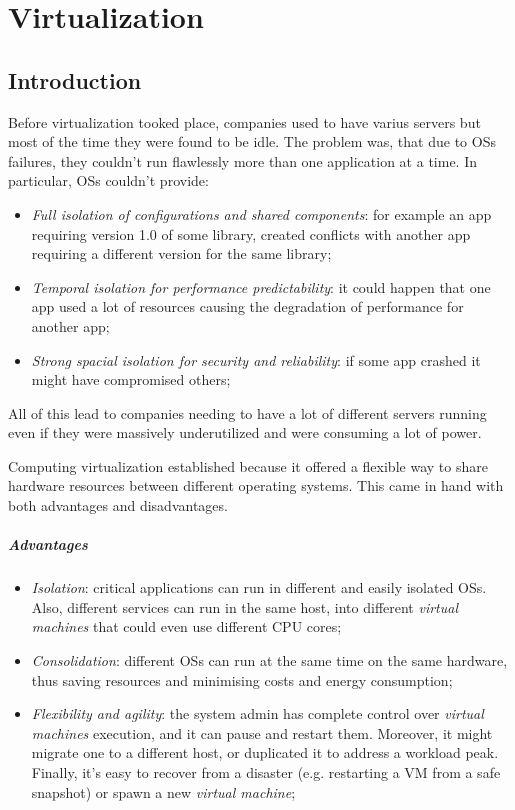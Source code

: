 \chapter{Virtualization}
\section{Introduction}
Before virtualization tooked place, companies used to have varius servers but
most of the time they were found to be idle. The problem was, that due to OSs
failures, they couldn't run flawlessly more than one application at a time. In
particular, OSs couldn't provide:
\begin{itemize}
    \item\emph{Full isolation of configurations and shared components}: for
    example an app requiring version 1.0 of some library, created conflicts
    with another app requiring a different version for the same library;
    \item\emph{Temporal isolation for performance predictability}: it could
    happen that one app used a lot of resources causing the degradation of
    performance for another app;
    \item\emph{Strong spacial isolation for security and reliability}: if
    some app crashed it might have compromised others;
\end{itemize}
All of this lead to companies needing to have a lot of different servers running
even if they were massively underutilized and were consuming a lot of power.

Computing virtualization established because it offered a flexible way to
share hardware resources between different operating systems. This came in hand
with both advantages and disadvantages.

\paragraph{Advantages}
\begin{itemize}
    \item\emph{Isolation}: critical applications can run in different and
    easily isolated OSs. Also, different services can run in the same host,
    into different \emph{virtual machines} that could even use different CPU cores;
    \item\emph{Consolidation}: different OSs can run at the same time on the
    same hardware, thus saving resources and minimising costs and energy
    consumption;
    \item\emph{Flexibility and agility}: the system admin has complete control
    over \emph{virtual machines} execution, and it can pause and restart them.
    Moreover, it might migrate one to a different host, or duplicated it to address a
    workload peak. Finally, it's easy to recover from a disaster (e.g. restarting
    a VM from a safe snapshot) or spawn a new \emph{virtual machine};
\end{itemize}
